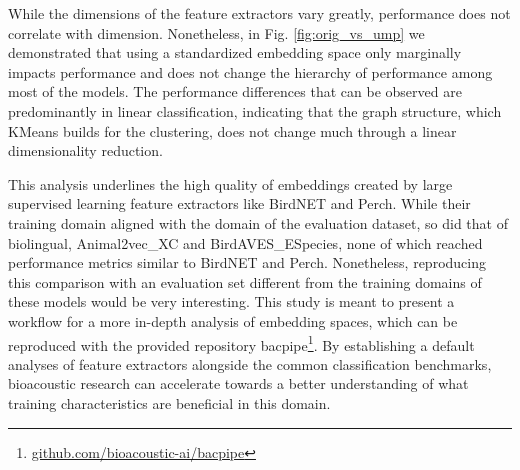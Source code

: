 While the dimensions of the feature extractors vary greatly, performance does not correlate with dimension.
Nonetheless, in Fig. \ref{fig:orig_vs_ump} we demonstrated that using a standardized embedding space only marginally impacts performance and does not change the hierarchy of performance among most of the models.
The performance differences that can be observed are predominantly in linear classification, indicating that the graph structure, which KMeans builds for the clustering, does not change much through a linear dimensionality reduction.

This analysis underlines the high quality of embeddings created by large supervised learning feature extractors like BirdNET and Perch.
While their training domain aligned with the domain of the evaluation dataset, so did that of biolingual, Animal2vec\_XC and BirdAVES\_ESpecies, none of which reached performance metrics similar to BirdNET and Perch.
Nonetheless, reproducing this comparison with an evaluation set different from the training domains of these models would be very interesting.
This study is meant to present a workflow for a more in-depth analysis of embedding spaces, which can be reproduced with the provided repository bacpipe\footnote{\url{github.com/bioacoustic-ai/bacpipe}}.
By establishing a default analyses of feature extractors alongside the common classification benchmarks, bioacoustic research can accelerate towards a better understanding of what training characteristics are beneficial in this domain.